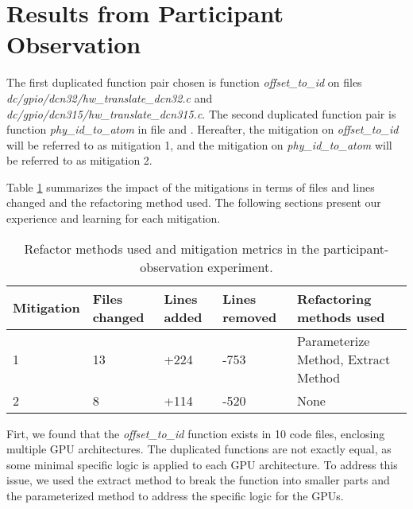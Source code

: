 \documentclass[10pt,conference]{IEEEtran}
\begin{document}
\section{Results from Participant Observation}

The first duplicated function pair chosen is function \textit{offset\_to\_id} on files \textit{dc/gpio/dcn32/hw\_translate\_dcn32.c} and \textit{dc/gpio/dcn315/hw\_translate\_dcn315.c}. The second duplicated function pair is function \textit{phy\_id\_to\_atom} in file 
\textit{ } and \textit{}.
Hereafter, the mitigation on \textit{offset\_to\_id} will be referred to as mitigation 1, and the mitigation on 
\textit{phy\_id\_to\_atom} will be referred to as mitigation 2.

Table \ref{tab:patch} summarizes the impact of the mitigations in terms of 
files and lines changed and the refactoring method used. The following sections present our experience and learning for each mitigation.

\begin{table}[ht]
\centering
\caption{Refactor methods used and mitigation metrics in the participant-observation experiment.}
\begin{tabular}{ | m{12mm} | m{10mm} | m{10mm} | m{14mm} | m{20mm} | }

\hline

\textbf{Mitigation} & \textbf{Files changed} & \textbf{Lines added} & \textbf{Lines removed} & \textbf{Refactoring methods used}
\\ \hline 

1 & 13 & +224 & -753 & Parameterize Method, Extract Method  \\ \hline
2 & 8 & +114 & -520 & None \\ \hline

\hline
\end{tabular}

\label{tab:patch}
\end{table}

Firt, we found that the \textit{offset\_to\_id} function 
exists in 10 code files, enclosing multiple GPU architectures. The duplicated 
functions are not exactly equal, as some minimal specific logic is applied to each GPU architecture. To address this issue, we used the extract method to 
break the function into smaller parts and the parameterized method to address 
the specific logic for the GPUs.
\end{document}
